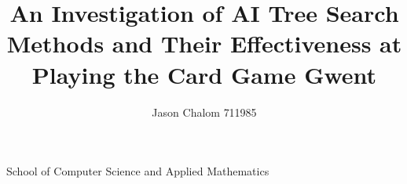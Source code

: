 \documentclass[journal]{IEEEtran}
\begin{document}

%
\title{An Investigation of AI Tree Search Methods and Their Effectiveness at Playing the Card Game Gwent}
%
%
%

\author{Jason Chalom 711985}

% 
%



%
{School of Computer Science and Applied Mathematics}
% 


\end{document}
